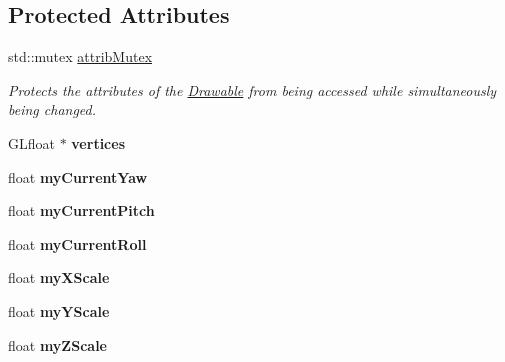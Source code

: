 \subsection*{Protected Attributes}
\begin{DoxyCompactItemize}
\item 
\mbox{\label{classtsgl_1_1_drawable_a598f96849973e9cfdbf68d0e2826716b}} 
std\+::mutex \hyperlink{classtsgl_1_1_drawable_a598f96849973e9cfdbf68d0e2826716b}{attrib\+Mutex}
\begin{DoxyCompactList}\small\item\em Protects the attributes of the \hyperlink{classtsgl_1_1_drawable}{Drawable} from being accessed while simultaneously being changed. \end{DoxyCompactList}\item 
\mbox{\label{classtsgl_1_1_drawable_a9521a664f36ac95c7cf4237fed0b6c6c}} 
G\+Lfloat $\ast$ {\bfseries vertices}
\item 
\mbox{\label{classtsgl_1_1_drawable_a753f3abfce4fc9b5aa598e9dea3412d1}} 
float {\bfseries my\+Current\+Yaw}
\item 
\mbox{\label{classtsgl_1_1_drawable_a22179a40f7d0c5470f7f2d81f38bf31b}} 
float {\bfseries my\+Current\+Pitch}
\item 
\mbox{\label{classtsgl_1_1_drawable_aed934d160d037c2f151b20a7a9b4896d}} 
float {\bfseries my\+Current\+Roll}
\item 
\mbox{\label{classtsgl_1_1_drawable_ae77c6e6f8d1a05e9e33e9d81010b7ab7}} 
float {\bfseries my\+X\+Scale}
\item 
\mbox{\label{classtsgl_1_1_drawable_a06f06101db328c6eaa4be3eb5c24b171}} 
float {\bfseries my\+Y\+Scale}
\item 
\mbox{\label{classtsgl_1_1_drawable_aafb57cc94337b39bed9aed2f5985ae06}} 
float {\bfseries my\+Z\+Scale}
\item 
\mbox{\label{classtsgl_1_1_drawable_a9b6135146dfb6d5afd51f14805088e85}} 

\end{DoxyCompactItemize}
